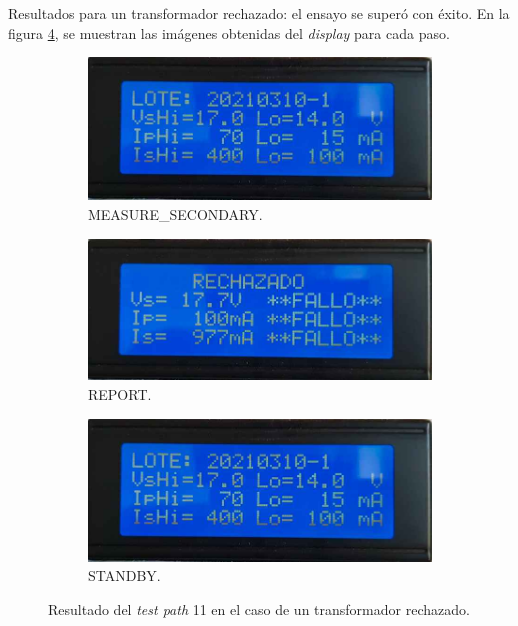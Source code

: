 Resultados para un transformador rechazado: el ensayo se superó con éxito. En la figura \ref{fig:pruConf_11_res_a}, se muestran las imágenes obtenidas del \textit{display} para cada paso.

\begin{figure}[!htpb]
     \centering
     \begin{subfigure}[b]{0.4\textwidth}
         \centering
         \includegraphics[width=1.1\textwidth]{./Figures/pru_fail.jpeg}
         \caption{MEASURE\_SECONDARY.}
         \label{fig:pruConf_11_1_a}
     \end{subfigure}
          \hfill
     \begin{subfigure}[b]{0.4\textwidth}
         \centering
         \includegraphics[width=1.1\textwidth]{./Figures/rechazado.jpeg}
         \caption{REPORT.}
         \label{fig:pruConf_11_2_a}
     \end{subfigure}
           \hfill
     \begin{subfigure}[b]{0.4\textwidth}
         \centering
         \includegraphics[width=1.1\textwidth]{./Figures/pru_fail.jpeg}
         \caption{STANDBY.}
         \label{fig:pruConf_11_3_a}
     \end{subfigure}
        \caption{Resultado del \textit{test path} 11 en el caso de un transformador rechazado.}
        \label{fig:pruConf_11_res_a}
\end{figure}

